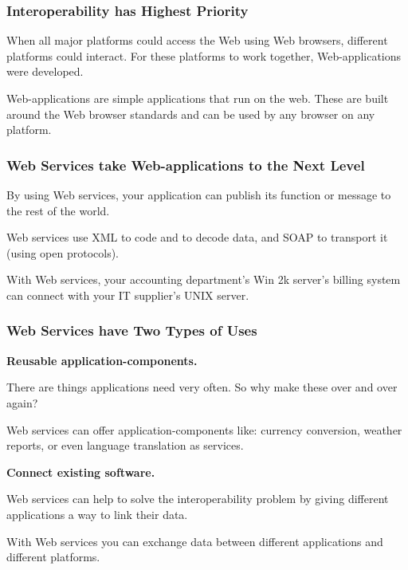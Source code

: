 \documentclass[12pt,a4paper]{article}
\begin{document}
\subsubsection{Interoperability has Highest Priority}

When all major platforms could access the Web using Web browsers, different platforms could interact. For these platforms to work together, Web-applications were developed.

Web-applications are simple applications that run on the web. These are built around the Web browser standards and can be used by any browser on any platform.

\subsubsection{Web Services take Web-applications to the Next Level}

By using Web services, your application can publish its function or message to the rest of the world.

Web services use XML to code and to decode data, and SOAP to transport it (using open protocols).

With Web services, your accounting department's Win 2k server's billing system can connect with your IT supplier's UNIX server.

\subsubsection{Web Services have Two Types of Uses}

\bf{Reusable application-components.}

There are things applications need very often. So why make these over and over again?

Web services can offer application-components like: currency conversion, weather reports, or even language translation as services.

\bf{Connect existing software.}

Web services can help to solve the interoperability problem by giving different applications a way to link their data.

With Web services you can exchange data between different applications and different platforms.
\end{document}
